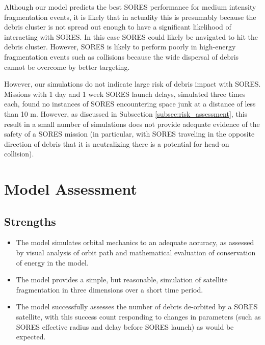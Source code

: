 \documentclass[12pt]{scrartcl}
\begin{document}
Although our model predicts the best SORES performance for medium intensity fragmentation events, it is likely that in actuality this is presumably because the debris cluster is not spread out enough to have a significant likelihood of interacting with SORES. In this case SORES could likely be navigated to hit the debris cluster. However, SORES is likely to perform poorly in high-energy fragmentation events such as collisions because the wide dispersal of debris cannot be overcome by better targeting.

However, our simulations do not indicate large risk of debris impact with SORES. Missions with 1 day and 1 week SORES launch delays, simulated three times each, found no instances of SORES encountering space junk at a distance of less than 10 m. However, as discussed in Subsection \ref{subsec:risk_assessment}, this result in a small number of simulations does not provide adequate evidence of the safety of a SORES mission (in particular, with SORES traveling in the opposite direction of debris that it is neutralizing there is a potential for head-on collision).

\section{Model Assessment} \label{sec:model_assessment}
\subsection{Strengths}
    \begin{itemize}
        \item The model simulates orbital mechanics to an adequate accuracy, as assessed by visual analysis of orbit path and mathematical evaluation of conservation of energy in the model.
        \item The model provides a simple, but reasonable, simulation of satellite fragmentation in three dimensions over a short time period.
        \item The model successfully assesses the number of debris de-orbited by a SORES satellite, with this success count responding to changes in parameters (such as SORES effective radius and delay before SORES launch) as would be expected.
    \end{itemize}
\end{document}
